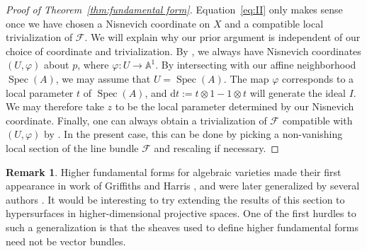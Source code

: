 \documentclass[12pt]{amsart}
\numberwithin{equation}{section}
\theoremstyle{plain}
\theoremstyle{definition}
\newtheorem{rem}[thm]{Remark}
\newcommand{\mb}[1]{\mathbb{#1}}
\newcommand{\mc}[1]{\mathcal{#1}}
\newcommand{\vphi}{\varphi}
\newcommand{\Spec}{\operatorname{Spec}}
\renewcommand{\d}{\mathrm{d}}
\begin{document}
\begin{proof}[Proof of Theorem~\ref{thm:fundamental form}]
    Equation~\eqref{eq:II} only makes sense once we have chosen a Nisnevich coordinate on $X$ and a compatible local trivialization of $\mc{F}$. We will explain why our prior argument is independent of our choice of coordinate and trivialization. By \cite[Proposition~20]{EnrichedCubicSurface}, we always have Nisnevich coordinates $(U,\vphi)$ about $p$, where $\vphi\colon U\to\mb{A}^1$. By intersecting with our affine neighborhood $\Spec(A)$, we may assume that $U=\Spec(A)$. The map $\vphi$ corresponds to a local parameter $t$ of $\Spec(A)$, and $\d{t}:=t\otimes 1-1\otimes t$ will generate the ideal $I$. We may therefore take $z$ to be the local parameter determined by our Nisnevich coordinate. Finally, one can always obtain a trivialization of $\mc{F}$ compatible with $(U,\vphi)$ by \cite[Proposition~5.5]{McK22}. In the present case, this can be done by picking a non-vanishing local section of the line bundle $\mc{F}$ and rescaling if necessary.
\end{proof}

\begin{rem}
Higher fundamental forms for algebraic varieties made their first appearance in work of Griffiths and Harris \cite{MR559347}, and were later generalized by several authors \cite{Teg92,landsbergseoul,einniu,MP24}. It would be interesting to try extending the results of this section to hypersurfaces in higher-dimensional projective spaces. One of the first hurdles to such a generalization is that the sheaves used to define higher fundamental forms need not be vector bundles.
\end{rem}



\end{document}
